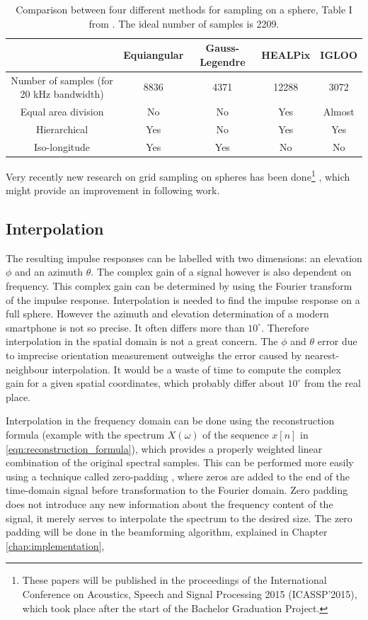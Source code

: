 \begin{table}[t]
\centering
\begin{tabular}{ccccc}
\hline
\hline
&Equiangular&Gauss-Legendre&HEALPix&IGLOO\\
\hline
Number of samples (for 20 kHz bandwidth)&8836&4371&12288&3072\\
Equal area division&No&No&Yes&Almost\\
Hierarchical&Yes&No&Yes&Yes\\
Iso-longitude&Yes&Yes&No&No\\
\hline
\hline
\end{tabular}
\caption{Comparison between four different methods for sampling on a sphere, Table I from \cite{Zhang2012575}. The ideal number of samples is 2209.}
\label{tab:IGLOO}
\end{table}

Very recently new research on grid sampling on spheres has been done\footnote{These papers will be published in the proceedings of the International Conference on Acoustics, Speech and Signal Processing 2015 (ICASSP'2015), which took place after the start of the Bachelor Graduation Project.}
\cite{bates2015optimal,khalidspherical}, which might provide an improvement in following work.

\subsection{Interpolation}
The resulting impulse responses can be labelled with two dimensions: an elevation $\phi$ and an azimuth $\theta$.
The complex gain of a signal however is also dependent on frequency.
This complex gain can be determined by using the Fourier transform of the impulse response.
Interpolation is needed to find the impulse response on a full sphere.
However \cite{goslinski2015performance,BAP:RoySjoerd} the azimuth and elevation determination of a modern smartphone is not so precise.
It often differs more than $10^\circ$.
Therefore interpolation in the spatial domain is not a great concern. The $\phi$ and $\theta$ error due to imprecise orientation measurement outweighs the error caused by nearest-neighbour interpolation.
It would be a waste of time to compute the complex gain for a given spatial coordinates, which probably differ about $10^\circ$ from the real place.

Interpolation in the frequency domain can be done using the reconstruction formula \cite[p.~420]{book:dsp} (example with the spectrum $X(\omega)$ of the sequence $x[n]$ in \eqref{eqn:reconstruction_formula}), which provides a properly weighted linear combination of the original spectral samples.
This can be performed more easily using a technique called zero-padding \cite[p.~420-425]{book:dsp}, where zeros are added to the end of the time-domain signal before  transformation to the Fourier domain.
Zero padding does not introduce any new information about the frequency content of the signal, it merely serves to interpolate the spectrum to the desired size.
The zero padding will be done in the beamforming algorithm, explained in Chapter \ref{chap:implementation},

